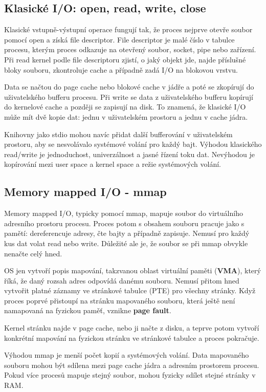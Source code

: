 \documentclass[11pt,a4paper]{article}
\begin{document}
\subsection*{Klasické I/O: open, read, write, close}

Klasické vstupně-výstupní operace fungují tak, že proces nejprve otevře soubor pomocí open a získá file descriptor. File descriptor je malé číslo v tabulce procesu, kterým proces odkazuje na otevřený soubor, socket, pipe nebo zařízení. Při read kernel podle file descriptoru zjistí, o jaký objekt jde, najde příslušné bloky souboru, zkontroluje cache a případně zadá I/O na blokovou vrstvu.

Data se načtou do page cache nebo blokové cache v jádře a poté se zkopírují do uživatelského bufferu procesu. Při write se data z uživatelského bufferu kopírují do kernelové cache a později se zapisují na disk. To znamená, že klasické I/O může mít dvě kopie dat: jednu v uživatelském prostoru a jednu v cache jádra.

Knihovny jako stdio mohou navíc přidat další bufferování v uživatelském prostoru, aby se nesvolávalo systémové volání pro každý bajt. Výhodou klasického read/write je jednoduchost, univerzálnost a jasné řízení toku dat. Nevýhodou je kopírování mezi user space a kernel space a režie systémových volání.

\subsection*{Memory mapped I/O - mmap}

Memory mapped I/O, typicky pomocí mmap, mapuje soubor do virtuálního adresního prostoru procesu. Proces potom s obsahem souboru pracuje jako s pamětí: dereferencuje adresy, čte bajty a případně zapisuje. Nemusí pro každý kus dat volat read nebo write. Důležité ale je, že soubor se při mmap obvykle nenačte celý hned.

OS jen vytvoří popis mapování, takzvanou oblast virtuální paměti (\textbf{VMA}), který říká, že daný rozsah adres odpovídá danému souboru. Nemusí přitom hned vytvořit platné záznamy ve stránkové tabulce (PTE) pro všechny stránky. Když proces poprvé přistoupí na stránku mapovaného souboru, která ještě není namapovaná na fyzickou paměť, vznikne \textbf{page fault}.

Kernel stránku najde v page cache, nebo ji načte z disku, a teprve potom vytvoří konkrétní mapování na fyzickou stránku ve stránkové tabulce a proces pokračuje.

Výhodou mmap je menší počet kopií a systémových volání. Data mapovaného souboru mohou být sdílena mezi page cache jádra a adresním prostorem procesu. Pokud více procesů mapuje stejný soubor, mohou fyzicky sdílet stejné stránky v RAM.
\end{document}
